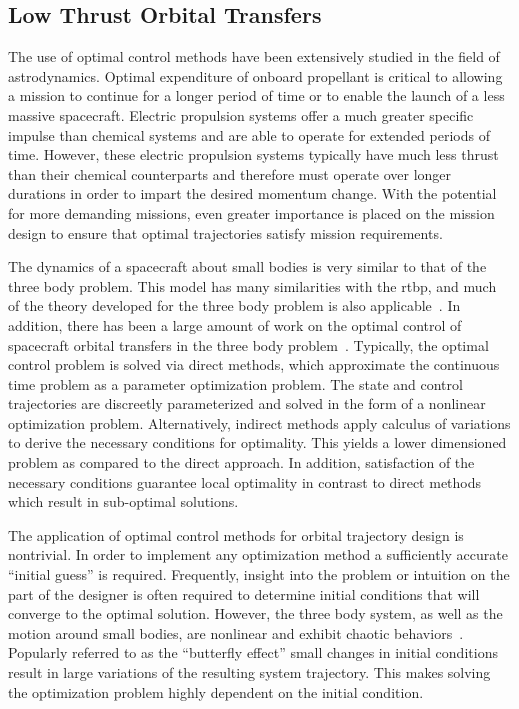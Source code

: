 \subsection{Low Thrust Orbital Transfers}

The use of optimal control methods have been extensively studied in the field of astrodynamics.
Optimal expenditure of onboard propellant is critical to allowing a mission to continue for a longer period of time or to enable the launch of a less massive spacecraft.
Electric propulsion systems offer a much greater specific impulse than chemical systems and are able to operate for extended periods of time.
However, these electric propulsion systems typically have much less thrust than their chemical counterparts and therefore must operate over longer durations in order to impart the desired momentum change.
With the potential for more demanding missions, even greater importance is placed on the mission design to ensure that optimal trajectories satisfy mission requirements. 

The dynamics of a spacecraft about small bodies is very similar to that of the three body problem.
This model has many similarities with the \gls{rtbp}, and much of the theory developed for the three body problem is also applicable~\cite{mondelo2010,herrera2014}.
In addition, there has been a large amount of work on the optimal control of spacecraft orbital transfers in the three body problem~\cite{mingotti2011,grebow2011}.
Typically, the optimal control problem is solved via direct methods, which approximate the continuous time problem as a parameter optimization problem.
The state and control trajectories are discreetly parameterized and solved in the form of a nonlinear optimization problem.
Alternatively, indirect methods apply calculus of variations to derive the necessary conditions for optimality. 
This yields a lower dimensioned problem as compared to the direct approach.
In addition, satisfaction of the necessary conditions guarantee local optimality in contrast to direct methods which result in sub-optimal solutions.

The application of optimal control methods for orbital trajectory design is nontrivial.
In order to implement any optimization method a sufficiently accurate ``initial guess'' is required.
Frequently, insight into the problem or intuition on the part of the designer is often required to determine initial conditions that will converge to the optimal solution.
However, the three body system, as well as the motion around small bodies, are nonlinear and exhibit chaotic behaviors~\cite{scheeres2012a,szebehely1967}.
Popularly referred to as the ``butterfly effect'' small changes in initial conditions result in large variations of the resulting system trajectory. 
This makes solving the optimization problem highly dependent on the initial condition.

